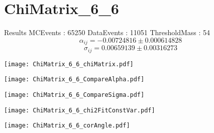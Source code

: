 \documentclass[a4paper,12pt]{article}
\begin{document}
\section{ChiMatrix\_6\_6}
\begin{minipage}{0.49\linewidth} Results \newline
MCEvents : 65250\newline
DataEvents : 11051 \newline
ThresholdMass : 54\\
$$\alpha_{ij} = -0.00724816\pm 0.000614828$$
$$\sigma_{ij} = 0.00659139\pm 0.00316273$$
\end{minipage}\hfill
\begin{minipage}{0.49\linewidth} 
\texttt{[image: ChiMatrix\_6\_6\_chiMatrix.pdf]}\\
\end{minipage}
\hfill
\begin{minipage}{0.49\linewidth} 
\texttt{[image: ChiMatrix\_6\_6\_CompareAlpha.pdf]}\\
\end{minipage}
\hfill
\begin{minipage}{0.49\linewidth} 
\texttt{[image: ChiMatrix\_6\_6\_CompareSigma.pdf]}\\
\end{minipage}
\begin{minipage}{0.49\linewidth} 
\texttt{[image: ChiMatrix\_6\_6\_chi2FitConstVar.pdf]}\\
\end{minipage}
\hfill
\begin{minipage}{0.49\linewidth} 
\texttt{[image: ChiMatrix\_6\_6\_corAngle.pdf]}\\
\end{minipage}
\end{document}
